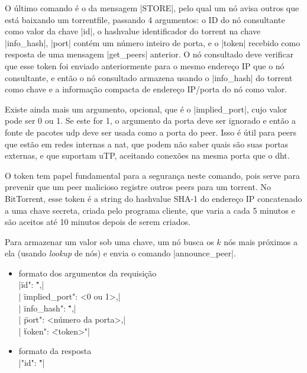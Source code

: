 

O último comando é o da mensagem \bverb|STORE|, pelo qual um nó avisa outros que está
baixando um \gls*{torrentfile}, passando 4 argumentos: o ID do nó consultante como
valor da chave \bverb|id|, o \gls*{hashvalue} identificador do \gls*{torrent} na
chave \bverb|info_hash|, \bverb|port| contém um número inteiro de porta, e o
\bverb|token| recebido como resposta de uma mensagem \bverb|get_peers| anterior. O nó
consultado deve verificar que esse token foi enviado anteriormente para o mesmo endereço
IP que o nó consultante, e então o nó consultado armazena usando o \bverb|info_hash| do
torrent como chave e a informação compacta de endereço IP/porta do nó como valor.

Existe ainda mais um argumento, opcional, que é o \bverb|implied_port|, cujo valor pode
ser 0 ou 1. Se este for 1, o argumento da porta deve ser ignorado e então a fonte de
pacotes \gls*{udp} deve ser usada como a porta do \gls*{peer}. Isso é útil para
\glspl*{peer} que estão em redes internas a \gls{nat}, que podem não saber quais são
suas portas externas, e que suportam uTP, aceitando conexões na mesma porta que o
\gls*{dht}.

O token tem papel fundamental para a segurança neste comando, pois serve para prevenir
que um \gls*{peer} malicioso registre outros \glspl*{peer} para um \gls*{torrent}. No
BitTorrent, esse token é a \gls*{string} do \gls*{hashvalue} SHA-1 do endereço IP
concatenado a uma chave secreta, criada pelo programa cliente, que varia a cada 5
minutos e são aceitos até 10 minutos depois de serem criados.

Para armazenar um valor sob uma chave, um nó busca os $k$ nós mais próximos a ela
(usando \emph{lookup} de nós) e envia o comando \bverb|announce_peer|.

\newpage
\begin{itemize}
    \item formato dos argumentos da requisição \\
        \sverb|{\"id": \"<IDs dos nós consultantes>",| \\
        \sverb| \"implied_port": <0 ou 1>,| \\
        \sverb| \"info_hash": \"<hash de 20 bytes do torrent>",| \\
        \sverb| \"port": <número da porta>,| \\
        \sverb| \"token": \"<token>"}|

    \item formato da resposta \\
        \sverb|{"id": \"<IDs dos nós consultados>"}|
\end{itemize}

